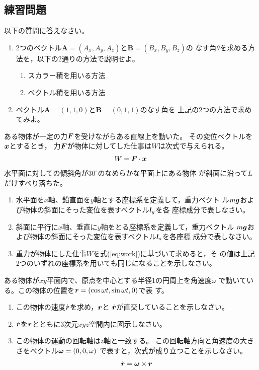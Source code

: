 \documentclass[twocolumn,11pt]{jarticle}
\begin{document}
\subsection{練習問題}
\nquestion 以下の質問に答えなさい。
\begin{enumerate}
\item 2つのベクトル$\boldsymbol{A}=(A_x,A_y,A_z)$と$\boldsymbol{B}=(B_x,B_y,B_z)$の
  なす角$\theta$を求める方法を，以下の2通りの方法で説明せよ。
  \begin{enumerate}
  \item スカラー積を用いる方法
  \item ベクトル積を用いる方法
  \end{enumerate}
\item ベクトル$\boldsymbol{A}=(1,1,0)$と$\boldsymbol{B}=(0,1,1)$のなす角を
上記の2つの方法で求めてみよ。
\end{enumerate}

\nquestion
ある物体が一定の力$\boldsymbol{F}$を受けながらある直線上を動いた。
その変位ベクトルを$\boldsymbol{x}$とするとき，
 力$\boldsymbol{F}$が物体に対してした仕事は$W$は次式で与えられる。
\begin{align}
  \label{eq:work}
  W=\boldsymbol{F}\cdot\boldsymbol{x}
\end{align}
水平面に対しての傾斜角が$30^{\circ}$のなめらかな平面上にある物体
が斜面に沿って$L$だけすべり落ちた。
\begin{enumerate}
\item 水平面を$x$軸、鉛直面を$y$軸とする座標系を定義して，重力ベクト
  ル$m\boldsymbol{g}$および物体の斜面にそった変位を表すベクトル$\boldsymbol{l}_g$を各
  座標成分で表しなさい。
\item 斜面に平行に$x$軸、垂直に$y$軸をとる座標系を定義して，重力ベクトル
  $m\boldsymbol{g}$および物体の斜面にそった変位を表すベクトル$\boldsymbol{l}_s$を各座標
  成分で表しなさい。
\item 重力が物体にした仕事$W$を式(\ref{eq:work})に基づいて求めると，そ
  の値は上記2つのいずれの座標系を用いても同じになることを示しなさい。
\end{enumerate}

\nquestion
ある物体が$xy$平面内で、原点を中心とする半径1の円周上を角速度$\omega$
で動いている。この物体の位置を$\boldsymbol{r}=(\cos\omega t,\sin\omega t,0)$で表
す。
\begin{enumerate}
\item この物体の速度$\dot{\boldsymbol{r}}$を求め，$\boldsymbol{r}$と
  $\dot{\boldsymbol{r}}$が直交していることを示しなさい。
\item $\dot{\boldsymbol{r}}$を$\boldsymbol{r}$とともに3次元$xyz$空間内に図示しなさい。
\item この物体の運動の回転軸は$z$軸と一致する。
  この回転軸方向と角速度の大きさをベクトル$\boldsymbol{\omega}=(0,0,\omega)$
  で表すと，次式が成り立つことを示しなさい。
  \begin{align}
    \dot{\boldsymbol{r}}=\boldsymbol{\omega}\times\boldsymbol{r}
  \end{align}
\end{enumerate}
\end{document}
